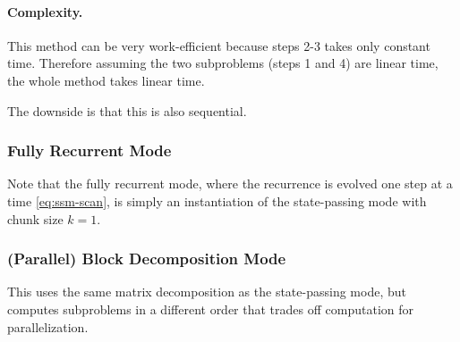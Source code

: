\paragraph{Complexity.}
This method can be very work-efficient because steps 2-3 takes only constant time.
Therefore assuming the two subproblems (steps 1 and 4) are linear time,
the whole method takes linear time.

The downside is that this is also sequential.

\subsubsection{Fully Recurrent Mode}

Note that the fully recurrent mode, where the recurrence is evolved one step at a time \eqref{eq:ssm-scan},
is simply an instantiation of the state-passing mode with chunk size $k=1$.

\subsubsection{(Parallel) Block Decomposition Mode}


This uses the same matrix decomposition as the state-passing mode,
but computes subproblems in a different order that trades off computation for parallelization.

